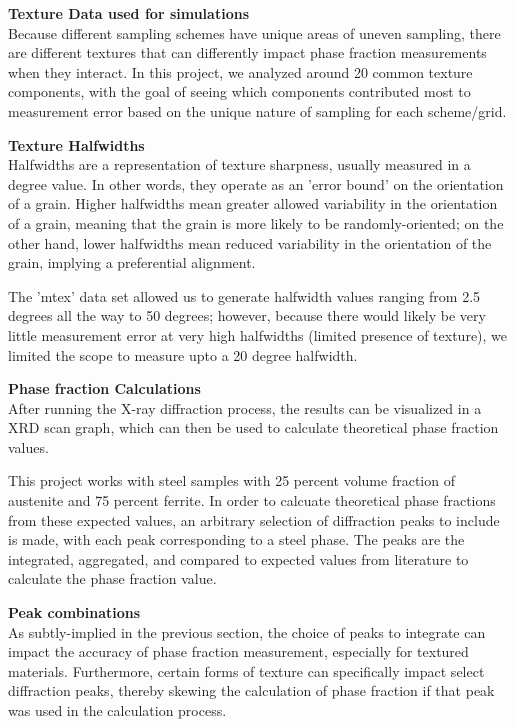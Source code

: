\documentclass{article}
\begin{document}
\textbf{Texture Data used for simulations}\\
Because different sampling schemes have unique areas of uneven sampling, there are different textures that can differently impact phase fraction measurements when they interact. In this project, we analyzed around 20 common texture components, with the goal of seeing which components contributed most to measurement error based on the unique nature of sampling for each scheme/grid.

\textbf{Texture Halfwidths}\\
Halfwidths are a representation of texture sharpness, usually measured in a degree value. In other words, they operate as an 'error bound' on the orientation of a grain. Higher halfwidths mean greater allowed variability in the orientation of a grain, meaning that the grain is more likely to be randomly-oriented; on the other hand, lower halfwidths mean reduced variability in the orientation of the grain, implying a preferential alignment.

The 'mtex' data set allowed us to generate halfwidth values ranging from 2.5 degrees all the way to 50 degrees; however, because there would likely be very little measurement error at very high halfwidths (limited presence of texture), we limited the scope to measure upto a 20 degree halfwidth. 

\textbf{Phase fraction Calculations}\\
After running the X-ray diffraction process, the results can be visualized in a XRD scan graph, which can then be used to calculate theoretical phase fraction values. 

This project works with steel samples with 25 percent volume fraction of austenite and 75 percent ferrite. In order to calcuate theoretical phase fractions from these expected values, an arbitrary selection of diffraction peaks to include is made, with each peak corresponding to a steel phase. The peaks are the integrated, aggregated, and compared to expected values from literature to calculate the phase fraction value.


\textbf{Peak combinations}\\
As subtly-implied in the previous section, the choice of peaks to integrate can impact the accuracy of phase fraction measurement, especially for textured materials. Furthermore, certain forms of texture can specifically impact select diffraction peaks, thereby skewing the calculation of phase fraction if that peak was used in the calculation process.
\end{document}
